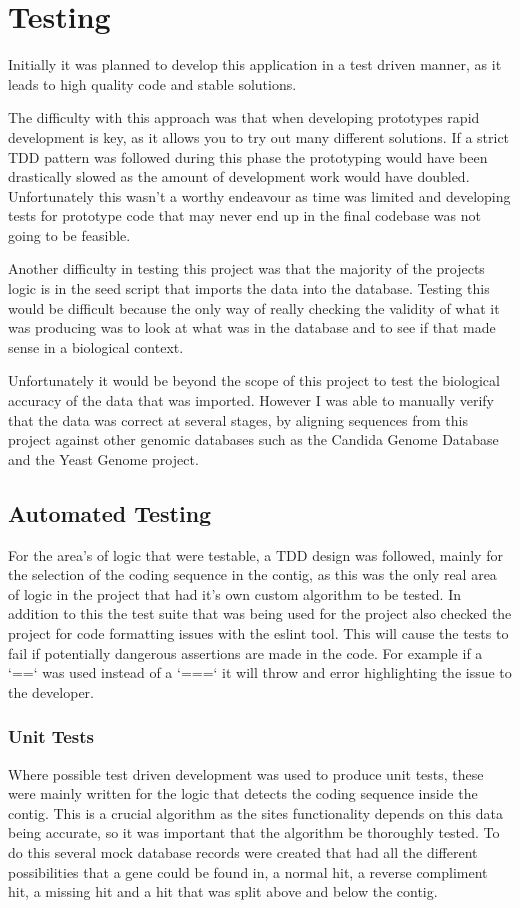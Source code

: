 {\section{Testing}
Initially it was planned to develop this application in a test driven manner, as it leads to high quality code and stable solutions. 

The difficulty with this approach was that when developing prototypes rapid development is key, as it allows you to try out many different solutions. If a strict TDD pattern was followed during this phase the prototyping would have been drastically slowed as the amount of development work would have doubled. Unfortunately this wasn't a worthy endeavour as time was limited and developing tests for prototype code that may never end up in the final codebase was not going to be feasible.

Another difficulty in testing this project was that the majority of the projects logic is in the seed script that imports the data into the database. Testing this would be difficult because the only way of really checking the validity of what it was producing was to look at what was in the database and to see if that made sense in a biological context. 

Unfortunately it would be beyond the scope of this project to test the biological accuracy of the data that was imported. However I was able to manually verify that the data was correct at several stages, by aligning sequences from this project against other genomic databases such as the Candida Genome Database\cite{cgd} and the Yeast Genome\cite{sgd} project. 

\subsection{Automated Testing}
For the area's of logic that were testable, a TDD design was followed, mainly for the selection of the coding sequence in the contig, as this was the only real area of logic in the project that had it's own custom algorithm to be tested. In addition to this the test suite that was being used for the project also checked the project for code formatting issues with the eslint\cite{eslint} tool. This will cause the tests to fail if potentially dangerous assertions are made in the code. For example if a `==` was used instead of a `===` it will throw and error highlighting the issue to the developer. 

\subsubsection{Unit Tests}
Where possible test driven development was used to produce unit tests, these were mainly written for the logic that detects the coding sequence inside the contig. This is a crucial algorithm as the sites functionality depends on this data being accurate, so it was important that the algorithm be thoroughly tested. To do this several mock database records were created that had all the different possibilities that a gene could be found in, a normal hit, a reverse compliment hit, a missing hit and a hit that was split above and below the contig. 

}
